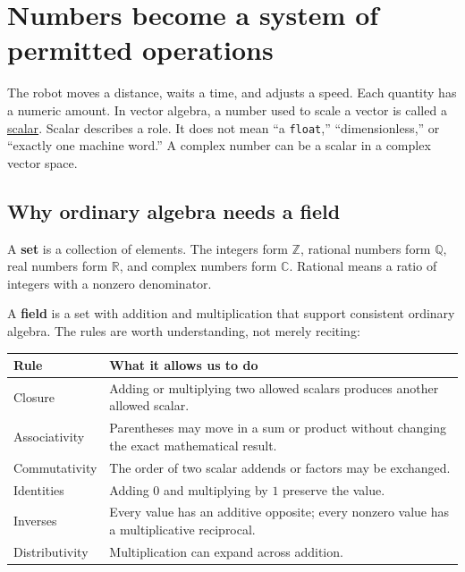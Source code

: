 \section{Numbers become a system of permitted operations}\label{01-foundations-i-ch017-numbers-become-a-system-of-permitted-operations}

The robot moves a distance, waits a time, and adjusts a speed. Each quantity has a numeric amount. In vector algebra, a number used to scale a vector is called a \hyperref[01-foundations-i-ch017-numbers-become-a-system-of-permitted-operations]{scalar}. Scalar describes a role. It does not mean ``a \texttt{float},'' ``dimensionless,'' or ``exactly one machine word.'' A complex number can be a scalar in a complex vector space.

\subsection{Why ordinary algebra needs a field}\label{01-foundations-i-ch017-why-ordinary-algebra-needs-a-field}

A \textbf{set} is a collection of elements. The integers form \(\mathbb Z\), rational numbers form \(\mathbb Q\), real numbers form \(\mathbb R\), and complex numbers form \(\mathbb C\). Rational means a ratio of integers with a nonzero denominator.

A \textbf{field} is a set with addition and multiplication that support consistent ordinary algebra. The rules are worth understanding, not merely reciting:

{\def\LTcaptype{none} %
\begin{longtable}[]{@{}
  >{\raggedright\arraybackslash}p{}
  >{\raggedright\arraybackslash}p{}@{}}
\toprule\noalign{}
\begin{minipage}[b]{\linewidth}\raggedright
Rule
\end{minipage} & \begin{minipage}[b]{\linewidth}\raggedright
What it allows us to do
\end{minipage} \\
\midrule\noalign{}
\endhead
\bottomrule\noalign{}
\endlastfoot
Closure & Adding or multiplying two allowed scalars produces another allowed scalar. \\
Associativity & Parentheses may move in a sum or product without changing the exact mathematical result. \\
Commutativity & The order of two scalar addends or factors may be exchanged. \\
Identities & Adding \(0\) and multiplying by \(1\) preserve the value. \\
Inverses & Every value has an additive opposite; every nonzero value has a multiplicative reciprocal. \\
Distributivity & Multiplication can expand across addition. \\
\end{longtable}
}

